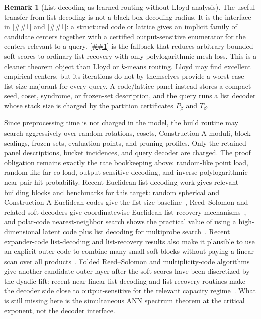 \documentclass[10pt]{article}
\newcommand{\cref}[1]{\ref{##1}}
\newcommand{\Cref}[1]{\ref{##1}}
\theoremstyle{definition}
\newtheorem{remark}[theorem]{Remark}
\begin{document}
\begin{remark}[List decoding as learned routing without Lloyd analysis]
   \label{rem:list-decoding-routing}
   The useful transfer from list decoding is not a black-box decoding radius.
   It is the interface in \cref{lem:soft-list-recovery-reporter} and
   \cref{cor:euclidean-list-decoder-reporter}: a structured code or lattice gives an
   implicit family of candidate centers together with a certified
   output-sensitive enumerator for the centers relevant to a query.
   \Cref{lem:hard-list-recovery-lift} is the fallback that reduces arbitrary
   bounded soft scores to ordinary list recovery with only polylogarithmic mesh
   loss.
   This is a cleaner theorem object than Lloyd or \(k\)-means routing.  Lloyd
   may find excellent empirical centers, but its iterations do not by
   themselves provide a worst-case list-size majorant for every query.  A
   code/lattice panel instead stores a compact seed, coset, syndrome, or
   frozen-set description, and the query runs a list decoder whose stack size is
   charged by the partition certificates \(P_\beta\) and \(T_\beta\).

   Since preprocessing time is not charged in the model, the build routine may
   search aggressively over random rotations, cosets, Construction-A moduli,
   block scalings, frozen sets, evaluation points, and pruning profiles.  Only
   the retained panel descriptions, bucket incidences, and query decoder are
   charged.  The proof obligation remains exactly the rate bookkeeping above:
   random-like point load, random-like far co-load, output-sensitive decoding,
   and inverse-polylogarithmic near-pair hit probability.  Recent Euclidean
   list-decoding work gives relevant building blocks and benchmarks for this
   target: random spherical and Construction-A Euclidean codes give the list
   size baseline~\cite{ZV21}, Reed--Solomon and related soft decoders give
   coordinatewise Euclidean list-recovery mechanisms~\cite{KV03,MP20,PH26},
   and polar-code nearest-neighbor search shows the practical value of using a
   high-dimensional latent code plus list decoding for multiprobe
   search~\cite{TV12,TH23}.  Recent expander-code list-decoding and
   list-recovery results also make it plausible to use an explicit outer code
   to combine many small soft blocks without paying a linear scan over all
   products~\cite{ST25}.  Folded Reed--Solomon and multiplicity-code
   algorithms give another candidate outer layer after the soft scores have
   been discretized by the dyadic lift: recent near-linear list-decoding and
   list-recovery routines make the decoder side close to output-sensitive for
   the relevant capacity regime~\cite{AHS26,GHKS25}.  What is still missing
   here is the simultaneous ANN spectrum theorem at the critical exponent, not
   the decoder interface.


\end{remark}
\end{document}
